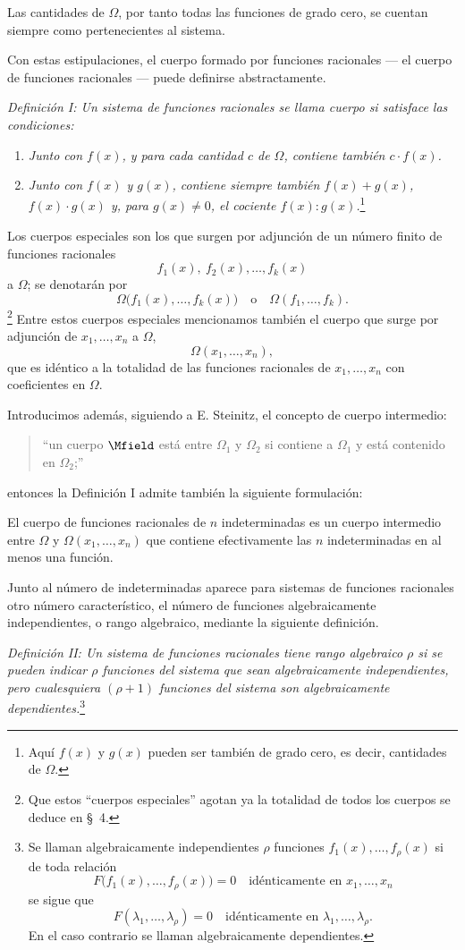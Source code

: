 \documentclass[11pt]{article}
\begin{document}
Las cantidades de $\Omega$, por tanto todas las funciones de grado cero, se cuentan siempre como pertenecientes al sistema.

Con estas estipulaciones, el cuerpo formado por funciones racionales --- el cuerpo de funciones racionales --- puede definirse abstractamente.

\emph{Definición I: Un sistema de funciones racionales se llama cuerpo si satisface las condiciones:}
\begin{enumerate}
\item \emph{Junto con $f(x)$, y para cada cantidad $c$ de $\Omega$, contiene también $c\cdot f(x)$.}
\item \emph{Junto con $f(x)$ y $g(x)$, contiene siempre también $f(x)+g(x)$, $f(x)\cdot g(x)$ y, para $g(x)\ne0$, el cociente $f(x):g(x)$.}\footnote{Aquí $f(x)$ y $g(x)$ pueden ser también de grado cero, es decir, cantidades de $\Omega$.}
\end{enumerate}
Los cuerpos especiales son los que surgen por adjunción de un número finito de funciones racionales
\[
  f_1(x),\ f_2(x),\ldots, f_k(x)
\]
a $\Omega$; se denotarán por
\[
  \Omega\bigl(f_1(x),\ldots,f_k(x)\bigr)
  \quad\text{o}\quad
  \Omega(f_1,\ldots,f_k).
\]
\footnote{Que estos ``cuerpos especiales'' agotan ya la totalidad de todos los cuerpos se deduce en \S\ 4.}
Entre estos cuerpos especiales mencionamos también el cuerpo que surge por adjunción de $x_1,\ldots,x_n$ a $\Omega$,
\[
  \Omega(x_1,\ldots,x_n),
\]
que es idéntico a la totalidad de las funciones racionales de $x_1,\ldots,x_n$ con coeficientes en $\Omega$.

Introducimos además, siguiendo a E. Steinitz, el concepto de cuerpo intermedio:
\begin{quote}
``un cuerpo $\Mfield$ está entre $\Omega_1$ y $\Omega_2$ si contiene a $\Omega_1$ y está contenido en $\Omega_2$;''
\end{quote}
entonces la Definición I admite también la siguiente formulación:

El cuerpo de funciones racionales de $n$ indeterminadas es un cuerpo intermedio entre $\Omega$ y $\Omega(x_1,\ldots,x_n)$ que contiene efectivamente las $n$ indeterminadas en al menos una función.

Junto al número de indeterminadas aparece para sistemas de funciones racionales otro número característico, el número de funciones algebraicamente independientes, o rango algebraico, mediante la siguiente definición.

\emph{Definición II: Un sistema de funciones racionales tiene rango algebraico $\rho$ si se pueden indicar $\rho$ funciones del sistema que sean algebraicamente independientes, pero cualesquiera $(\rho+1)$ funciones del sistema son algebraicamente dependientes.}\footnote{Se llaman algebraicamente independientes $\rho$ funciones $f_1(x),\ldots,f_\rho(x)$ si de toda relación
\[
F\bigl(f_1(x),\ldots,f_\rho(x)\bigr)=0\quad\text{idénticamente en }x_1,\ldots,x_n
\]
se sigue que
\[
F(\lambda_1,\ldots,\lambda_\rho)=0\quad\text{idénticamente en }\lambda_1,\ldots,\lambda_\rho.
\]
En el caso contrario se llaman algebraicamente dependientes.}
\end{document}
